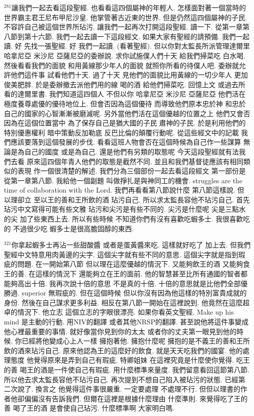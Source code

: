 \documentclass{book}
\begin{document}
$^{281}$讓我們一起去看這段聖經.
也看看這四個屬神的年輕人.
怎樣面對著一個當時的世界霸主君王尼布甲尼沙皇.
他掌管著古近東的世界.
但是仍然這四個屬神的子民.
不容許自己被這個世界所玷污.
讓我們一起再次打開這段聖經.
讀一下.
從第一章第八節到第十六節.
我們一起去讀一下這段經文.
如果大家有聖經的請預備.
我們一起讀.
好 先找一張聖經.
好 我們一起讀.
(看著聖經).
但以你對太監長所派管理達爾里 哈拿尼亞 米沙尼 亞薩尼亞的委辦說.
求你試施僕人們十天 給我們掃菜吃 白水喝.
然後看看我們的面貌 和用黃線那少年人的面貌 就照你所看的待僕人吧.
委辦就允許他們這件事 試看他們十天.
過了十天 見他們的面貌比用黃線的一切少年人 更加俊美肥胖.
於是委辦撤去派他們用的線 喝的酒 給他們掃菜吃.
回憶上文 或過去所看的達爾里書.
我們知道這四個人 不但以你 哈拿尼亞 米沙尼 亞薩尼亞 他們活在極度養尊處優的優待地位上.
但會否因為這個優待 而導致他們原本忠於神 和忠於自己的國家的心智漸漸被磨滅呢.
另外當他們活在這個優越的位置之上 他們又會否因為在這個位置當中 為了保存自己是猶大國的子民 肅神的子民.
於是利用他們的特別優惠權利 暗中策動反加勒底 反巴比倫的顛覆行動呢.
從這些經文中的記載 我們應該要落到這個發展的步伐.
看看這班人物會否在這個時候為自己作一些謀算 無論是為自己的國度 或是為自己.
還是他們有另類的取態呢 今天這段聖經就有法我們去看 原來這四個年青人他們的取態是截然不同.
並且和我們基督徒應該有相同類似的表現 作一個很清楚的解述.
我們分為三個部份一起去看這段經文 第一部份是從第一章第八節.
我給他一個副題 叫做掙扎是與神同工的機會.
struggles are the time of collaboration with the Lord.
我們再看看第八節說什麼 第八節這樣說.
但以理卻立 至以王的善和王所飲的酒 玷污自己.
所以求太監長容他不玷污自己.
首先玷污中文寫得可能有些文雅 玷污和尖污是有些不同的.
尖污是什麼呢 尖是三點水的尖 加了些東西上去.
所以有些時候 不知道你們有沒有喜歡吃蝦多士.
我很喜歡吃的 不過很少吃 蝦多士是很高膽固醇的東西.

$^{321}$你拿起蝦多士再沾一些甜酸醬 或者是蛋黃醬來吃.
這樣就好吃了 加上去.
但我們聖經中文特意用肉黃邊的尖字.
這個尖字就有些不同的意思.
這個尖字就是指到瑕疵的問題.
在一開始第八節 但以理在這麼優越的情況下.
又能夠飲王的酒 又能夠食王的善.
在這樣的情況下 還能夠立在王的面前.
他的智慧甚至比所有通國的智者都能夠高出十倍.
我再次說十倍的意思 不是真的十倍.
十倍的意思就是比他們全部優勝過.
superior 無瑕疵的.
但在這個時候 但以你沒有因為他這樣的特別富貴成就的身份.
然後在自己謀求更多利益.
相反在第八節一開始在這裡說到.
他竟然在這麼超卓的情況下.
他立志 這個立志的字眼很漂亮.
如果你看英文聖經.
Make up his mind 是主動的行動.
用NIV的翻譯 或者其他NRSP的翻譯.
甚至說他將這件事變成他心裡最重要的事情.
就好像當你見到你的太太 或者你的丈夫第一眼見到他的時候.
你已經將他變成心上人一樣 擁抱著他.
擁抱什麼呢 擁抱的是不義王的善和王所飲的酒來玷污自己.
原來他認為王的這麼好的飲食.
就是天天吃我們的國宴.
他的處理態度 他覺得原來是弄到自己有瑕疵.
特卿姐妹 在這裡究竟是什麼使你覺得.
吃王的善 喝王的酒是一件使自己有瑕疵.
用什麼標準來量度.
我們留意看回這節第八節.
所以他去求太監長容他不玷污自己.
再次提到不想自己陷入被玷污的狀態.
已經第二次說了.
換言之 他覺得這件事很嚴重.
一定要處理 不處理不行.
但但以理書的作者他卻偏偏沒有告訴我們.
但爾在這裡是根據什麼理由 什麼準則.
來覺得吃了王的善 喝了王的酒 是會使自己玷污.
什麼標準啊 大家明白嗎.
\end{document}
